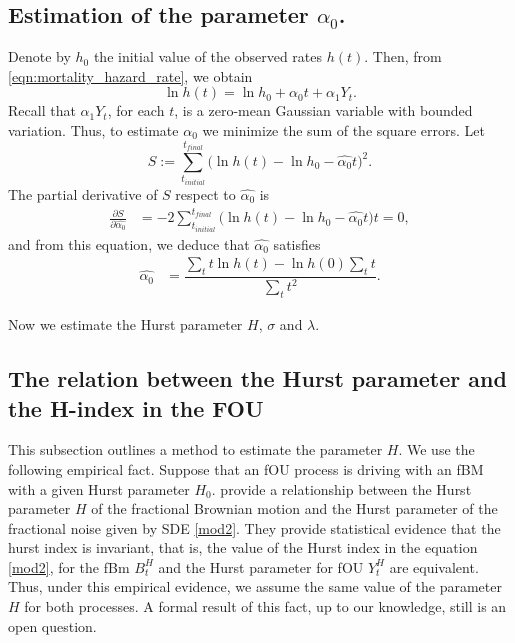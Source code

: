 \documentclass[smallextended]{svjour3}
\begin{document}
    \subsection{Estimation of the parameter $\alpha_0$.}
%
%
   Denote by $h_0$ the initial 
    value of the observed rates $h(t)$. Then, from 
    \eqref{eqn:mortality_hazard_rate}, we obtain
    \begin{equation}
        \ln h(t)=
            \ln h_0 + \alpha_0 t + \alpha_1 Y_t. \label{mod-ln}
    \end{equation}
      Recall that $\alpha_1 Y_t$,  for each $t$, is a zero-mean Gaussian variable with bounded variation. Thus, to estimate $\alpha_0$ we minimize the sum of the square errors.
    Let 
    \begin{equation*}
        S:= 
            \sum_{t_{initial}} ^ {t_{final}} 
                \Big( 
                    \ln h(t) 
                    - \ln h_0 
                    - \widehat{\alpha_0} t
                \Big)^2. 
    \end{equation*}
    The partial derivative of $S$ respect to $\widehat{\alpha_0}$ is
    \begin{align*}
        \frac{\partial S}{\partial \widehat{\alpha_0}}&=
            -2 \sum_{t_{initial}} ^ {t_{final}} 
            \Big( 
                \ln h(t)-\ln h_0-\widehat{\alpha_0} t
            \Big) t =0, %
    \end{align*}
    and from this equation, we deduce that  $\widehat{\alpha_0}$ satisfies
    \begin{align}
        \widehat{\alpha_0} 
            &= 
            \dfrac{
                \sum_{t} t 
                \ln h(t) 
                - 
                \ln h(0)
                \sum_{t} t
            }{
                \sum_{t} t^2
            }. \label{alpha0}
    \end{align}

    Now we estimate the Hurst parameter $H$, $\sigma$ and $\lambda$.

    \subsection{The relation between the Hurst 
        parameter and the H-index in the FOU}

        This subsection outlines a method to estimate the parameter $H$. 
    We use the following empirical fact. Suppose that an fOU process is driving 
    with an fBM with a given Hurst parameter $H_0$. 
    \citet{ye-etal}  provide a relationship between the Hurst parameter $H$ of 
    the fractional Brownian motion and the Hurst parameter of the fractional 
    noise given by SDE \eqref{mod2}. They provide statistical evidence that 
    the hurst index is invariant, that is, the  value of the
    Hurst index in the equation \eqref{mod2}, for the fBm $B_t^H$ and
    the Hurst parameter for fOU $Y_t^H$ are equivalent. Thus, under this empirical 
    evidence, we assume the same value of the parameter $H$ for both 
    processes.  A formal result of this fact, up to our knowledge, still is an 
    open question.
\end{document}

